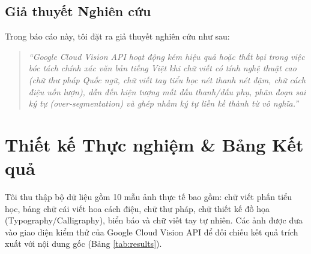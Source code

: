 \documentclass[11pt,a4paper]{article}
\begin{document}
\subsection{Giả thuyết Nghiên cứu}
Trong báo cáo này, tôi đặt ra giả thuyết nghiên cứu như sau:
\begin{quote}
\textit{``Google Cloud Vision API hoạt động kém hiệu quả hoặc thất bại trong việc bóc tách chính xác văn bản tiếng Việt khi chữ viết có tính nghệ thuật cao (chữ thư pháp Quốc ngữ, chữ viết tay tiểu học nét thanh nét đậm, chữ cách điệu uốn lượn), dẫn đến hiện tượng mất dấu thanh/dấu phụ, phân đoạn sai ký tự (over-segmentation) và ghép nhầm ký tự liền kề thành từ vô nghĩa.''}
\end{quote}

\section{Thiết kế Thực nghiệm \& Bảng Kết quả}

Tôi thu thập bộ dữ liệu gồm 10 mẫu ảnh thực tế bao gồm: chữ viết phấn tiểu học, bảng chữ cái viết hoa cách điệu, chữ thư pháp, chữ thiết kế đồ họa (Typography/Calligraphy), biển báo và chữ viết tay tự nhiên. Các ảnh được đưa vào giao diện kiểm thử của Google Cloud Vision API để đối chiếu kết quả trích xuất với nội dung gốc (Bảng \ref{tab:results}).
\end{document}
